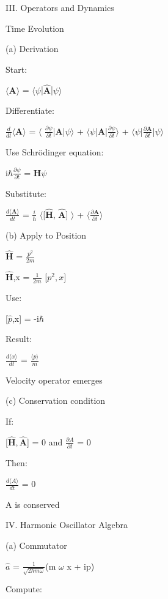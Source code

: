 \documentclass[a4paper, 10pt, onepage]{elegantbook}
\begin{document}
{III. Operators and Dynamics  

Time Evolution  

(a) Derivation 

Start: 
 
    $\langle \mathbf {A} \rangle$ = $\langle \psi$|$\mathbf {\hat A}$|$\psi \rangle$ 

Differentiate: 
 
$\frac{d}{dt} \langle \mathbf {A} \rangle$ = $\langle$ $\frac{\partial \psi}{\partial t}$|$\mathbf A$|$\psi \rangle$ + 
$\langle \psi$|$\mathbf A$|$\frac{\partial \psi}{\partial t} \rangle$ + $\langle \psi$|$\frac{\partial \mathbf 
A}{\partial t}$|$\psi \rangle$   
        
Use Schr\"odinger equation:  
  
    i$\hbar \frac{\partial \psi}{\partial t}$ = $\mathbf H \psi$ 
    
Substitute: 
 
$\frac{d \langle \mathbf A \rangle}{dt}$ = $\frac{i}{\hbar}$ $\langle$[$\mathbf {\hat H}$, $\mathbf {\hat A}$] 
$\rangle$ + $\langle \frac{\partial \mathbf A}{\partial t} \rangle$  
                              
    
 (b) Apply to Position 

$\mathbf {\hat H}$ = $\frac{p^2}{2m}$ 
 
$\mathbf{\hat  H}$,x = $\frac{1}{2m}$ [$p^2,x]$  

Use:  
  
    [$\hat p$,x] = -i$\hbar$  
    
Result:  

    $\frac{d \langle x \rangle}{dt}$ = $\frac{\langle p \rangle}{m}$ 
 
    Velocity operator emerges  
    
(c) Conservation condition 

If: 
 
    [$\mathbf {\hat H}, \mathbf {\hat A}$] = 0 and $\frac{\partial A}{\partial t}$ = 0 
 
    Then: 
 
        $\frac{d \langle A \rangle}{dt}$ = 0 
 
        A is conserved  

IV. Harmonic Oscillator Algebra 

(a) Commutator  
  
$\hat a$ = $\frac{1}{\sqrt{2 \hbar {m} \omega}}$(m $\omega$ x + ip)  

Compute: 
 
}
\end{document}
